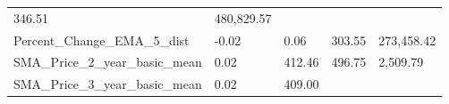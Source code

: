 \documentclass[]{article}
\begin{document}
\begin{longtable}[]{@{}lllll@{}}
\begin{minipage}[t]{0.09\columnwidth}
346.51\strut
\end{minipage} & \begin{minipage}[t]{0.11\columnwidth}\raggedright\strut
480,829.57\strut
\end{minipage}\tabularnewline
\begin{minipage}[t]{0.49\columnwidth}\raggedright\strut
Percent\_Change\_EMA\_5\_dist\strut
\end{minipage} & \begin{minipage}[t]{0.08\columnwidth}\raggedright\strut
-0.02\strut
\end{minipage} & \begin{minipage}[t]{0.09\columnwidth}\raggedright\strut
0.06\strut
\end{minipage} & \begin{minipage}[t]{0.09\columnwidth}\raggedright\strut
303.55\strut
\end{minipage} & \begin{minipage}[t]{0.11\columnwidth}\raggedright\strut
273,458.42\strut
\end{minipage}\tabularnewline
\begin{minipage}[t]{0.49\columnwidth}\raggedright\strut
SMA\_Price\_2\_year\_basic\_mean\strut
\end{minipage} & \begin{minipage}[t]{0.08\columnwidth}\raggedright\strut
0.02\strut
\end{minipage} & \begin{minipage}[t]{0.09\columnwidth}\raggedright\strut
412.46\strut
\end{minipage} & \begin{minipage}[t]{0.09\columnwidth}\raggedright\strut
496.75\strut
\end{minipage} & \begin{minipage}[t]{0.11\columnwidth}\raggedright\strut
2,509.79\strut
\end{minipage}\tabularnewline
\begin{minipage}[t]{0.49\columnwidth}\raggedright\strut
SMA\_Price\_3\_year\_basic\_mean\strut
\end{minipage} & \begin{minipage}[t]{0.08\columnwidth}\raggedright\strut
0.02\strut
\end{minipage} & \begin{minipage}[t]{0.09\columnwidth}\raggedright\strut
409.00\strut
\end{minipage} & \begin{minipage}[t]{0.09\columnwidth}\raggedright\strut

\end{minipage}
\end{longtable}
\end{document}
